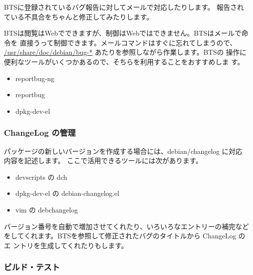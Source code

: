 \documentclass[mingoth,a4paper]{jsarticle}
\begin{document}
BTSに登録されているバグ報告に対してメールで対応したりします。
報告されている不具合をちゃんと修正してみたりします。

BTSは閲覧はWebでできますが、制御はWebではできません。BTSはメールで命令を
直接うって制御できます。メールコマンドはすぐに忘れてしまうので、
\url{/usr/share/doc/debian/bug-*} あたりを参照しながら作業します。BTSの
操作に便利なツールがいくつかあるので、そちらを利用することをおすすめしま
す。

\begin{itemize}
 \item  reportbug-ng 
 \item  reportbug
 \item  dpkg-dev-el 
\end{itemize}

 \subsubsection{ChangeLog の管理}

パッケージの新しいバージョンを作成する場合には、debian/changelog に対応
内容を記述します。
ここで活用できるツールには次があります。

\begin{itemize}
 \item devscripts の dch
 \item dpkg-dev-el の debian-changelog.el
 \item vim の debchangelog 
\end{itemize}

バージョン番号を自動で増加させてくれたり、いろいろなエントリーの補完など
をしてくれます。BTSを参照して修正されたバグのタイトルから ChangeLog のエ
ントリを生成してくれたりもします。


\subsubsection{ビルド・テスト}
\end{document}
